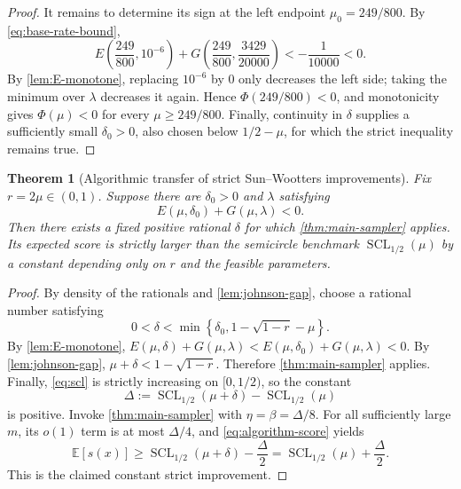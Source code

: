\documentclass[11pt,letterpaper]{article}
\newtheorem{theorem}{Theorem}[section]
\theoremstyle{definition}
\newcommand{\SCL}{\operatorname{SCL}}
\newcommand{\E}{\mathbb{E}}
\begin{document}
\begin{proof}
It remains to determine its sign at the left endpoint
$\mu_0=249/800$.  By \cref{eq:base-rate-bound},
\begin{equation}
 E\!\left(\frac{249}{800},10^{-6}\right)
 +G\!\left(\frac{249}{800},\frac{3429}{20000}\right)
 <-\frac1{10000}<0.
\end{equation}
By \cref{lem:E-monotone}, replacing $10^{-6}$ by $0$ only decreases the left side; taking the minimum over $\lambda$ decreases it again.  Hence
$\Phi(249/800)<0$, and monotonicity gives $\Phi(\mu)<0$ for every
$\mu\ge249/800$.  Finally, continuity in $\delta$ supplies a sufficiently small
$\delta_0>0$, also chosen below $1/2-\mu$, for which the strict inequality remains true.
\end{proof}

\begin{theorem}[Algorithmic transfer of strict Sun--Wootters improvements]
\label{thm:qualitative-transfer}
Fix $r=2\mu\in(0,1)$.  Suppose there are $\delta_0>0$ and $\lambda$ satisfying
\begin{equation}
   E(\mu,\delta_0)+G(\mu,\lambda)<0.
   \label{eq:feasible-delta0}
\end{equation}
Then there exists a fixed positive rational $\delta$ for which \cref{thm:main-sampler} applies.  Its expected score is strictly larger than the semicircle benchmark $\SCL_{1/2}(\mu)$ by a constant depending only on $r$ and the feasible parameters.
\end{theorem}

\begin{proof}
By density of the rationals and \cref{lem:johnson-gap}, choose a rational number satisfying
\begin{equation}
   0<\delta<\min\left\{
       \delta_0,
       1-\sqrt{1-r}-\mu
   \right\}.
   \label{eq:shrunk-delta}
\end{equation}
By \cref{lem:E-monotone},
$E(\mu,\delta)+G(\mu,\lambda)<E(\mu,\delta_0)+G(\mu,\lambda)<0$.
By \cref{lem:johnson-gap}, $\mu+\delta<1-\sqrt{1-r}$.  Therefore \cref{thm:main-sampler} applies.  Finally, \cref{eq:scl} is strictly increasing on $[0,1/2)$, so the constant
\[
   \Delta:=\SCL_{1/2}(\mu+\delta)-\SCL_{1/2}(\mu)
\]
is positive.  Invoke \cref{thm:main-sampler} with $\eta=\beta=\Delta/8$.  For all sufficiently large $m$, its $o(1)$ term is at most $\Delta/4$, and \cref{eq:algorithm-score} yields
\[
   \E[s(x)]
   \ge \SCL_{1/2}(\mu+\delta)-\frac{\Delta}{2}
   =\SCL_{1/2}(\mu)+\frac{\Delta}{2}.
\]
This is the claimed constant strict improvement.
\end{proof}
\end{document}

